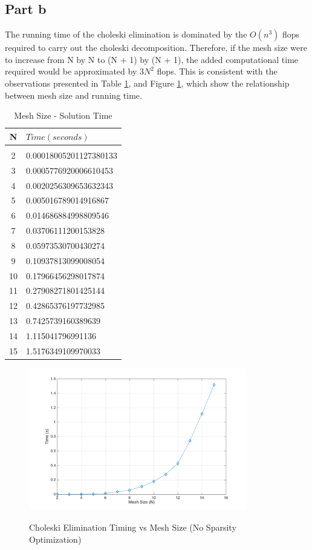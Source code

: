 \documentclass[11pt]{amsart}
\begin{document}
\subsection*{Part b} The running time of the choleski elimination is dominated by the $O(n^3)$ flops required to carry out the choleski decomposition. Therefore, if the mesh size were to increase from N by N to (N + 1) by (N + 1), the added computational time required would be approximated by $3N^2$ flops. This is consistent with the observations presented in Table \ref{tbl:time_v_mesh}, and Figure \ref{fig:t_n_unopt}, which show the relationship between mesh size and running time.

\begin{table}[h!]
    \caption{Mesh Size - Solution Time}
    \label{tbl:time_v_mesh}
    \begin{tabular}{ c| l}
    	\textbf{N} & \textbf{$Time (seconds)$}\\ \hline \\
	2 & 0.00018005201127380133\\
	3 & 0.0005776920006610453\\
	4 & 0.0020256309653632343\\
	5 & 0.005016789014916867\\
	6 & 0.014686884998809546\\
	7 & 0.03706111200153828\\
	8 & 0.05973530700430274\\
	9 & 0.10937813099008054\\
	10 & 0.17966456298017874\\
	11 & 0.27908271801425144\\
	12 & 0.42865376197732985\\
	13 & 0.7425739160389639\\
	14 & 1.115041796991136\\
	15 & 1.5176349109970033
    \end{tabular}
\end{table}

\vspace{3em}

\begin{center}
	\begin{figure}[h]
		\caption{Choleski Elimination Timing vs Mesh Size (No Sparsity Optimization)}
		\includegraphics[width=0.85\textwidth]{assets/t_vs_n_unopt.png}\label{fig:t_n_unopt}
	\end{figure}
\end{center}
\end{document}
